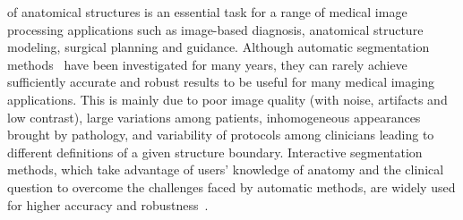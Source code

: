 \documentclass[10pt,journal,compsoc]{IEEEtran}
\begin{document}
% 
% 
% 
% 
 of anatomical structures is an essential task for a range of medical image processing applications such as image-based diagnosis, anatomical structure modeling, surgical planning and guidance. %
Although automatic segmentation methods~\cite{Sharma2010} have been investigated for many years, they can rarely achieve sufficiently accurate and robust results to be useful for many medical imaging applications. This is mainly due to poor image quality (with noise, artifacts and low contrast), large variations among patients, inhomogeneous appearances brought by pathology, and variability of protocols among clinicians leading to different definitions of a given structure boundary. Interactive segmentation methods, which take advantage of users' knowledge of anatomy and the clinical question to overcome the challenges faced by automatic methods, are widely used for higher accuracy and robustness~\cite{Zhao2013}. 
\end{document}
